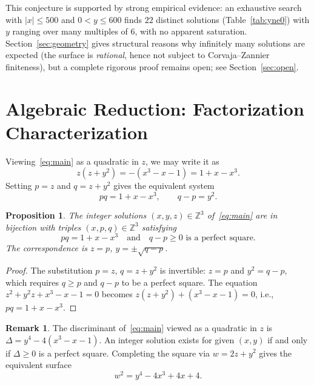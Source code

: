 \documentclass[12pt,a4paper]{article}
\newtheorem{proposition}[theorem]{Proposition}
\theoremstyle{definition}
\newtheorem{remark}[theorem]{Remark}
\newcommand{\Z}{\mathbb{Z}}
\begin{document}
\noindent
This conjecture is supported by strong empirical evidence: an exhaustive
search with $|x|\le500$ and $0<y\le 600$ finds $22$ distinct solutions
(Table~\ref{tab:yne0}) with $y$ ranging over many multiples of $6$, with
no apparent saturation.  Section~\ref{sec:geometry} gives structural
reasons why infinitely many solutions are expected (the surface is
\emph{rational}, hence not subject to Corvaja--Zannier finiteness), but
a complete rigorous proof remains open; see Section~\ref{sec:open}.

\section{Algebraic Reduction: Factorization Characterization}
\label{sec:factorization}

Viewing~\eqref{eq:main} as a quadratic in $z$, we may write it as
\[
  z(z + y^2) = -(x^3 - x - 1) = 1 + x - x^3.
\]
Setting $p = z$ and $q = z + y^2$ gives the equivalent system
\begin{equation}\label{eq:factored}
  pq = 1 + x - x^3, \qquad q - p = y^2.
\end{equation}

\begin{proposition}\label{prop:bij}
  The integer solutions $(x,y,z)\in\Z^3$ of~\eqref{eq:main} are in bijection with
  triples $(x,p,q)\in\Z^3$ satisfying
  \[
    pq = 1 + x - x^3 \quad \text{and} \quad q - p \ge 0 \text{ is a perfect square.}
  \]
  The correspondence is $z=p$, $y = \pm\sqrt{q-p}$.
\end{proposition}

\begin{proof}
  The substitution $p=z$, $q=z+y^2$ is invertible: $z=p$ and $y^2=q-p$, which
  requires $q\ge p$ and $q-p$ to be a perfect square.  The equation $z^2+y^2z+
  x^3-x-1=0$ becomes $z(z+y^2)+(x^3-x-1)=0$, i.e., $pq=1+x-x^3$.
\end{proof}

\begin{remark}
  The discriminant of~\eqref{eq:main} viewed as a quadratic in $z$ is
  $\Delta = y^4 - 4(x^3 - x - 1)$.
  An integer solution exists for given $(x,y)$ if and only if $\Delta\ge0$ is a
  perfect square.  Completing the square via $w = 2z + y^2$ gives the
  equivalent surface
  \begin{equation}\label{eq:surfaceA}
    w^2 = y^4 - 4x^3 + 4x + 4.
  \end{equation}
\end{remark}
\end{document}
